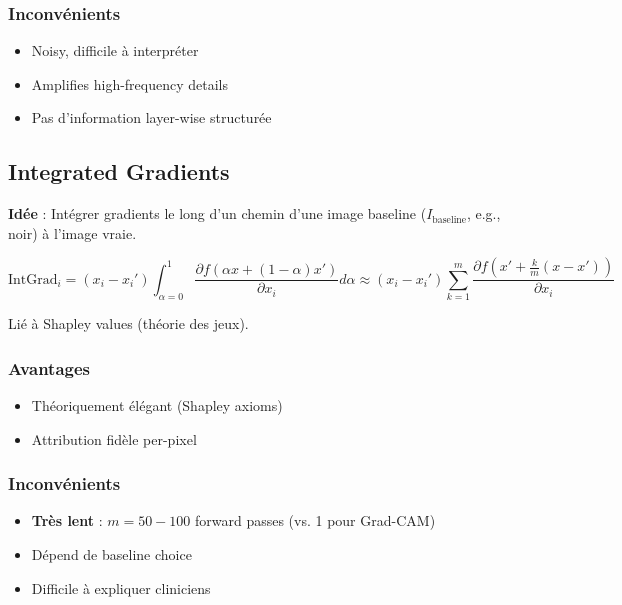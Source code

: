 \documentclass[12pt,a4paper,oneside]{report}
\begin{document}
\subsubsection{Inconvénients}

\begin{itemize}
    \item Noisy, difficile à interpréter
    \item Amplifies high-frequency details
    \item Pas d'information layer-wise structurée
\end{itemize}

\subsection{Integrated Gradients}

\textbf{Idée} : Intégrer gradients le long d'un chemin d'une 
image baseline ($I_{\text{baseline}}$, e.g., noir) à l'image vraie.

\begin{equation}
\text{IntGrad}_i = (x_i - x_i') \int_{\alpha=0}^{1} 
\frac{\partial f(\alpha x + (1-\alpha) x')}{\partial x_i} d\alpha
\approx (x_i - x_i') \sum_{k=1}^{m} 
\frac{\partial f(x' + \frac{k}{m}(x - x'))}{\partial x_i}
\label{eq:integrated_gradients}
\end{equation}

Lié à Shapley values (théorie des jeux).

\subsubsection{Avantages}

\begin{itemize}
    \item Théoriquement élégant (Shapley axioms)
    \item Attribution fidèle per-pixel
\end{itemize}

\subsubsection{Inconvénients}

\begin{itemize}
    \item \textbf{Très lent} : $m=50-100$ forward passes 
          (vs. 1 pour Grad-CAM)
    \item Dépend de baseline choice
    \item Difficile à expliquer cliniciens
\end{itemize}
\end{document}
